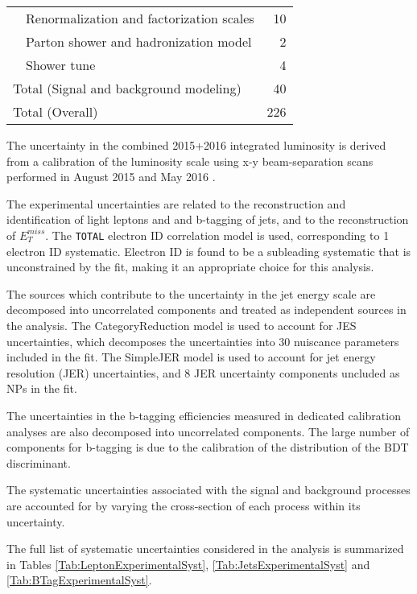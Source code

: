 \begin{table}[H]
\begin{tabular}{lr}
\ \ Renormalization and factorization scales    & 10                  \\
\ \ Parton shower and hadronization model               & 2                   \\
\ \ Shower tune                         & 4                   \\
\hline
Total (Signal and background modeling)       & 40                    \\
\hline\hline
Total (Overall)                             & 226             \\
\hline\hline
\end{tabular}
\label{tab:SystSummary}
\end{table}

The uncertainty in the combined 2015+2016 integrated luminosity is derived from a calibration of the luminosity scale using x-y beam-separation scans performed in August 2015 and May 2016 \cite{lumi}.

The experimental uncertainties are related to the reconstruction and identification of light leptons and and b-tagging of jets, and to the reconstruction of $E^{miss}_T$. The \verb!TOTAL! electron ID correlation model is used, corresponding to 1 electron ID systematic. Electron ID is found to be a subleading systematic that is unconstrained by the fit, making it an appropriate choice for this analysis.

The sources which contribute to the uncertainty in the jet energy scale \cite{jes} are decomposed into uncorrelated components and treated as independent sources in the analysis. The CategoryReduction model is used to account for JES uncertainties, which decomposes the uncertainties into 30 nuiscance parameters included in the fit. The SimpleJER model is used to account for jet energy resolution (JER) uncertainties, and 8 JER uncertainty components uncluded as NPs in the fit.

The uncertainties in the b-tagging efficiencies measured in dedicated calibration analyses \cite{btag_cal} are also decomposed into uncorrelated components. The large number of components for b-tagging is due to the calibration of the distribution of the BDT discriminant.

The systematic uncertainties associated with the signal and background processes are accounted for by varying the cross-section of each process within its uncertainty.

The full list of systematic uncertainties considered in the analysis is summarized in Tables
\ref{Tab:LeptonExperimentalSyst}, \ref{Tab:JetsExperimentalSyst} and \ref{Tab:BTagExperimentalSyst}.

